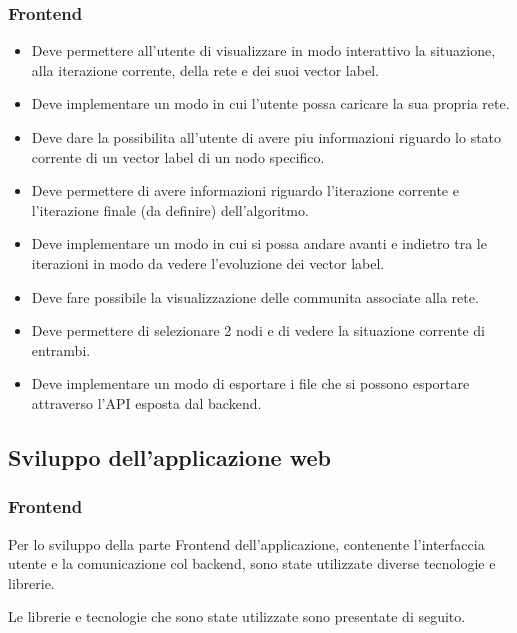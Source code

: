 \documentclass[a4paper,12pt]{report}
\begin{document}
			\subsubsection{Frontend}
				\begin{itemize}
					\item Deve permettere all'utente di visualizzare in modo interattivo la situazione, alla iterazione corrente, della rete e dei suoi vector label.
					\item Deve implementare un modo in cui l'utente possa caricare la sua propria rete.
					\item Deve dare la possibilita all'utente di avere piu informazioni riguardo lo stato corrente di un vector label di un nodo specifico.
					\item Deve permettere di avere informazioni riguardo l'iterazione corrente e l'iterazione finale (da definire) dell'algoritmo.
					\item Deve implementare un modo in cui si possa andare avanti e indietro tra le iterazioni in modo da vedere l'evoluzione dei vector label.
					\item Deve fare possibile la visualizzazione delle communita associate alla rete.
					\item Deve permettere di selezionare 2 nodi e di vedere la situazione corrente di entrambi.
					\item Deve implementare un modo di esportare i file che si possono esportare attraverso l'API esposta dal backend.
				\end{itemize}

		\subsection{Sviluppo dell'applicazione web}

			\subsubsection{Frontend}
			Per lo sviluppo della parte Frontend dell'applicazione, contenente l'interfaccia utente e la comunicazione col backend, sono state utilizzate diverse tecnologie e librerie. \par
			Le librerie e tecnologie che sono state utilizzate sono presentate di seguito.
\end{document}
